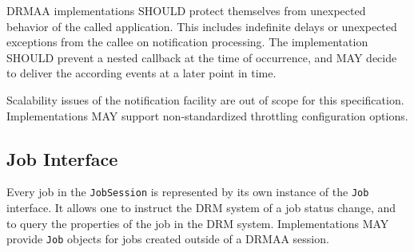 \documentclass{article}
\newcommand{\h}[1]{\lstinline|#1|}
\newcommand{\rat}[1]{}
\begin{document}
DRMAA implementations SHOULD protect themselves from unexpected behavior of the called application. This includes indefinite delays or unexpected exceptions from the callee on notification processing. The implementation SHOULD prevent a nested callback at the time of occurrence, and MAY decide to deliver the according events at a later point in time. 

Scalability issues of the notification facility are out of scope for this specification. Implementations MAY support non-standardized throttling configuration options.

\rat{
We intentionally did not add \h{subState} to the notification information, since this would make callback interface implementations specific for the DRM system, without any chance for creating a portable DRMAA application. 

The \h{DrmaaNotification} structure intentionally avoids to reference a \h{Job} object - instead, all relevant lookup information (session name + job ID) is provided. This demands only non-interface data types to be understandable in the callback target. Also, it hopefully helps to support scalability of high-frequent event callbacks.
}


\subsection{Job Interface}
\label{sec:job}

Every job in the \h{JobSession} is represented by its own instance of the \h{Job} interface. It allows one to instruct the DRM system of a job status change, and to query the properties of the job in the DRM system. Implementations MAY provide \h{Job} objects for jobs created outside of a DRMAA session.



\rat{
In comparison to DRMAA v1.0, DRMAA2 replaces the identification of jobs by strings with Job objects. This enables a tighter integration of job meta-data and identity, for the price of reduced performance in (so far not existing) DRMAA RPC scenarios. The former DRMAA control() with the JobControlAction structure is now split up into dedicated functions (such as hold() and release()) on the Job object.
	
Even though the DRMAAv2 surveys showed interest in interactive job support, this feature was intentionally left out. Reasons are the missing support in some major DRM systems, and the lack of a relevant DRMAA-related use case (conf. call Jan 7th 2010)

Issue \#5877 (support for direct job signaling) was rejected, even though there was an according request from the SAGA WG. Issue \#2782 (change attributes of submitted, but pending jobs) was rejected based on group decision.
}
\end{document}
